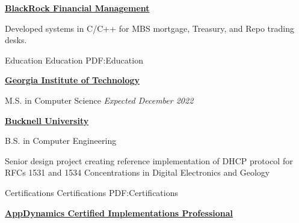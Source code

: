 \documentclass[letterpaper,MMMMyyyy,nonstopmode]{simpleresumecv}
\newif\ifLOCATION
\begin{document}
\begin{Body}
\BigGap
\Entry
\href{http://www.blackrock.com/}
{\textbf{BlackRock Financial Management}}
\begin{Detail}
\BulletItem
Developed systems in C/C++ for MBS mortgage, Treasury, and Repo trading desks.
\end{Detail}
\fi %
%

\Section
{Education}
{Education}
{PDF:Education}

\Entry
\href{https://gatech.edu}
{\textbf{Georgia Institute of Technology}}

M.S. in Computer Science
\hfill 
\textit{Expected December 2022}


\Gap

\Entry
\href{http://www.bucknell.edu/}
{\textbf{Bucknell University}}
\ifLOCATION
\hfill Lewisburg, Pennsylvania
\fi

B.S. in Computer Engineering
\iffalse
\hfill
\DatestampYM{1988}{09} --
\DatestampYM{1992}{06}
\fi
\begin{Detail}
\BulletItem
Senior design project creating reference implementation of DHCP protocol for RFCs 1531 and 1534
\BulletItem
Concentrations in Digital Electronics and Geology

\end{Detail}


\Section
{Certifications}
{Certifications}
{PDF:Certifications}

\Entry
\href{https://www.appdynamics.com/certifications/}
{\textbf{AppDynamics Certified Implementations Professional}}
\hfill
{}
\iffalse
\begin{Detail}
\begin{quote}
``An individual who attains the AppDynamics Certified Implementation Professional certification has demonstrated that he or she possesses the minimum acceptable level of knowledge and skills required to deploy AppDynamics Controllers, Agents, EUM Servers and Analytics Servers. 
This individual also has experience using AppDynamics APIs to extend and customize the AppDynamics platform.''
\end{quote}
\end{Detail}
\fi


\end{Body}
\end{document}
